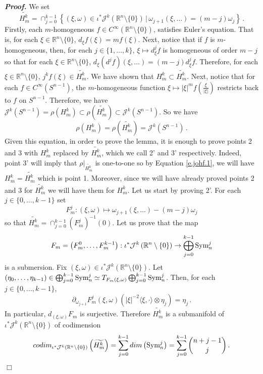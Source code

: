 \documentclass[10pt,twoside]{article}
\newcommand{\calJ}{\mathcal{J}}
\newcommand{\Rnzls}{\mathbb{R}^n\setminus\{0\}}
\newcommand{\Sym}{\textup{Sym}}
\newenvironment{prf}[1][]
{\vskip 2mm  {\it \bf Proof#1. }}{$\Box$ \vskip 2mm}
\numberwithin{theorem}{section}
\begin{document}
\begin{prf}
We set
\[
\widetilde{H^k_m}=\cap_{j=0}^{k-1}\left\{(\xi,\omega)\in\iota^*\calJ^k\left(\Rnzls\right)\, \Big |\, \omega_{j+1}(\xi,\dots)=(m-j)\omega_j\right\}\, .
\]
Firstly, each $m$-homogeneous $f\in C^\infty\left(\Rnzls\right)$, satisfies Euler's equation. That is, for each $\xi\in\Rnzls$, $d_\xi f(\xi)=m f(\xi)$. Next, notice that if $f$ is $m$-homogeneous, then, for each $j\in\{1,\dots,k\}$, $\xi\mapsto d^j_\xi f$ is homogeneous of order $m-j$ so that for each $\xi\in\Rnzls$, $d_\xi\left(d^jf\right)(\xi,\dots)=(m-j)d^j_\xi f$. Therefore, for each $\xi\in\Rnzls$, $j^kf(\xi)\in \widetilde{H^k_m}$. We have shown that $H^k_m\subset\widetilde{H^k_m}$.
Next, notice that for each $f\in C^\infty\left(S^{n-1}\right)$, the $m$-homogeneous function $\xi\mapsto |\xi|^mf\left(\frac{\xi}{|\xi|}\right)$ restricts back to $f$ on $S^{n-1}$. Therefore, we have $\calJ^k\left(S^{n-1}\right)=\rho\left(H^k_m\right)\subset\rho\left(\widetilde{H^k_m}\right)\subset\calJ^k\left(S^{n-1}\right)$. So we have
\begin{equation}\label{e.johf.1}
\rho\left(H^k_m\right)=\rho\left(\widetilde{H^k_m}\right)=\calJ^k\left(S^{n-1}\right)\, .
\end{equation}
Given this equation, in order to prove the lemma, it is enough to prove points 2 and 3 with $H^k_m$ replaced by $\widetilde{H^k_m}$, which we call 2' and 3' respectively. Indeed, point 3' will imply that $\rho|_{\widetilde{H^k_m}}$ is one-to-one so by Equation \eqref{e.johf.1}, we will have $H^k_m=\widetilde{H^k_m}$ which is point 1. Moreover, since we will have already proved points 2 and 3 for $\widetilde{H^k_m}$ we will have them for $H^k_m$. Let us start by proving 2'. For each $j\in\{0,\dots,k-1\}$ set
\[
F^j_m:(\xi,\omega)\mapsto \omega_{j+1}(\xi,\dots)-(m-j)\omega_j
\]
so that $\widetilde{H^k_m}=\cap_{j=0}^{k-1} \left(F^j_m\right)^{-1}\left(0\right)$. Let us prove that the map
\[
F_m=\left(F_m^0,\dots,F_m^{k-1}\right):\iota^*\calJ^k\left(\Rnzls\right)\rightarrow\bigoplus_{j=0}^{k-1}\Sym_n^j
\]
is a submersion. Fix $(\xi,\omega)\in\iota^*\calJ^k\left(\Rnzls\right)$. Let $(\eta_0,\dots,\eta_{k-1})\in \bigoplus_{j=0}^{k-1}\Sym_n^j\simeq T_{F_m(\xi,\omega)}\bigoplus_{j=0}^{k-1}\Sym_n^j$. Then, for each $j\in\{0,\dots,k-1\}$,
\[
\partial_{\omega_{j+1}}F_m^j(\xi,\omega)\left(|\xi|^{-2}\langle \xi,\cdot\rangle\otimes\eta_j\right)=\eta_j\, .
\]
In particular, $d_{(\xi,\omega)}F_m$ is surjective. Therefore $\widetilde{H^k_m}$ is a submanifold of $\iota^*\calJ^k\left(\Rnzls\right)$ of codimension
\[
codim_{\iota^*\calJ^k\left(\Rnzls\right)}\left(\widetilde{H^k_m}\right)=\sum_{j=0}^{k-1}dim\left(\Sym_n^j\right)=\sum_{j=0}^{k-1}\binom{n+j-1}{j}\, .
\]
\end{prf}
\end{document}
